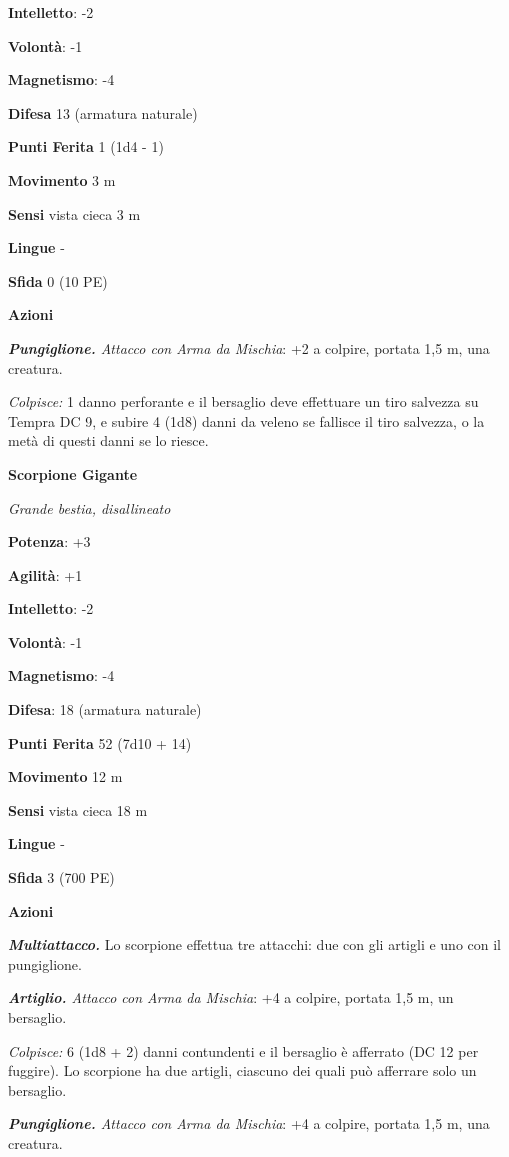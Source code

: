 \begin{multicols}{2}
\textbf{Intelletto}: -2

\textbf{Volontà}: -1

\textbf{Magnetismo}: -4

\textbf{Difesa} 13 (armatura naturale)

\textbf{Punti Ferita} 1 (1d4 - 1)

\textbf{Movimento} 3 m

\textbf{Sensi} vista cieca 3 m

\textbf{Lingue} -

\textbf{Sfida} 0 (10 PE)

\textbf{Azioni}

\emph{\textbf{Pungiglione.} Attacco con Arma da Mischia}: +2 a colpire,
portata 1,5 m, una creatura.

\emph{Colpisce:} 1 danno perforante e il bersaglio deve effettuare un
tiro salvezza su Tempra DC 9, e subire 4 (1d8) danni da veleno se
fallisce il tiro salvezza, o la metà di questi danni se lo riesce.

\textbf{Scorpione Gigante}

\emph{Grande bestia, disallineato}

\textbf{Potenza}: +3

\textbf{Agilità}: +1

\textbf{Intelletto}: -2

\textbf{Volontà}: -1

\textbf{Magnetismo}: -4

\textbf{Difesa}: 18 (armatura naturale)

\textbf{Punti Ferita} 52 (7d10 + 14)

\textbf{Movimento} 12 m

\textbf{Sensi} vista cieca 18 m

\textbf{Lingue} -

\textbf{Sfida} 3 (700 PE)

\textbf{Azioni}

\emph{\textbf{Multiattacco.}} Lo scorpione effettua tre attacchi: due
con gli artigli e uno con il pungiglione.

\emph{\textbf{Artiglio.} Attacco con Arma da Mischia}: +4 a colpire,
portata 1,5 m, un bersaglio.

\emph{Colpisce:} 6 (1d8 + 2) danni contundenti e il bersaglio è
afferrato (DC 12 per fuggire). Lo scorpione ha due artigli, ciascuno dei
quali può afferrare solo un bersaglio.

\emph{\textbf{Pungiglione.} Attacco con Arma da Mischia}: +4 a colpire,
portata 1,5 m, una creatura.


\end{multicols}
